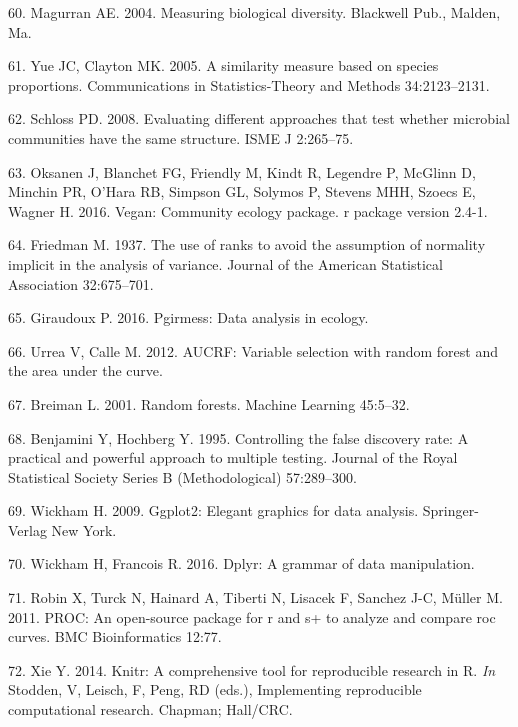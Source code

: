 \documentclass[11pt,]{article}
\begin{document}
\hypertarget{ref-magurran_measuring_2004}{}
60. Magurran AE. 2004. Measuring biological diversity. Blackwell Pub.,
Malden, Ma.

\hypertarget{ref-yue_thetaYC_2005}{}
61. Yue JC, Clayton MK. 2005. A similarity measure based on species
proportions. Communications in Statistics-Theory and Methods
34:2123--2131.

\hypertarget{ref-schloss_commstruct_2008}{}
62. Schloss PD. 2008. Evaluating different approaches that test whether
microbial communities have the same structure. ISME J 2:265--75.

\hypertarget{ref-oksanen_vegan_2016}{}
63. Oksanen J, Blanchet FG, Friendly M, Kindt R, Legendre P, McGlinn D,
Minchin PR, O'Hara RB, Simpson GL, Solymos P, Stevens MHH, Szoecs E,
Wagner H. 2016. Vegan: Community ecology package. r package version
2.4-1.

\hypertarget{ref-friedman_1937}{}
64. Friedman M. 1937. The use of ranks to avoid the assumption of
normality implicit in the analysis of variance. Journal of the American
Statistical Association 32:675--701.

\hypertarget{ref-pgirmess}{}
65. Giraudoux P. 2016. Pgirmess: Data analysis in ecology.

\hypertarget{ref-AUCRF}{}
66. Urrea V, Calle M. 2012. AUCRF: Variable selection with random forest
and the area under the curve.

\hypertarget{ref-breiman_rf_2001}{}
67. Breiman L. 2001. Random forests. Machine Learning 45:5--32.

\hypertarget{ref-Benjamini_Hochberg_1995}{}
68. Benjamini Y, Hochberg Y. 1995. Controlling the false discovery rate:
A practical and powerful approach to multiple testing. Journal of the
Royal Statistical Society Series B (Methodological) 57:289--300.

\hypertarget{ref-ggplot2}{}
69. Wickham H. 2009. Ggplot2: Elegant graphics for data analysis.
Springer-Verlag New York.

\hypertarget{ref-dplyr}{}
70. Wickham H, Francois R. 2016. Dplyr: A grammar of data manipulation.

\hypertarget{ref-pROC}{}
71. Robin X, Turck N, Hainard A, Tiberti N, Lisacek F, Sanchez J-C,
Müller M. 2011. PROC: An open-source package for r and s+ to analyze and
compare roc curves. BMC Bioinformatics 12:77.

\hypertarget{ref-knitr2014}{}
72. Xie Y. 2014. Knitr: A comprehensive tool for reproducible research
in R. \emph{In} Stodden, V, Leisch, F, Peng, RD (eds.), Implementing
reproducible computational research. Chapman; Hall/CRC.
\end{document}
